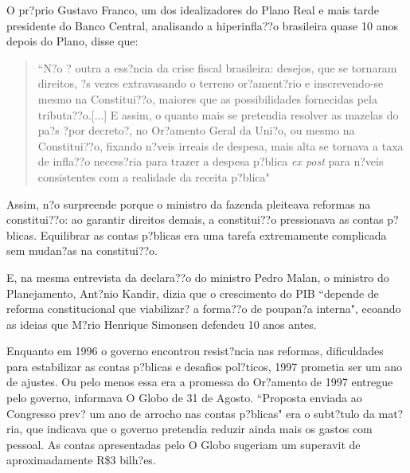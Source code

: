 \documentclass{article}
\begin{document}
O pr?prio Gustavo Franco, um dos idealizadores do Plano Real e mais tarde presidente do Banco Central, analisando a hiperinfla??o brasileira quase 10 anos depois do Plano, disse que:

\begin{quote}
``N?o ? outra a ess?ncia da crise fiscal brasileira: desejos, que se tornaram direitos, ?s vezes extravasando o terreno or?ament?rio e inscrevendo-se mesmo na Constitui??o, maiores que as possibilidades fornecidas pela tributa??o.[...] E assim, o quanto mais se pretendia resolver as mazelas do pa?s ?por decreto?, no Or?amento Geral da Uni?o, ou mesmo na Constitui??o, fixando n?veis irreais de despesa, mais alta se tornava a taxa de infla??o necess?ria para trazer a despesa p?blica \textit{ex post} para n?veis consistentes com a realidade da receita p?blica" \citep{Francoxxxx}
\end{quote}

Assim, n?o surpreende porque o ministro da fazenda pleiteava reformas na constitui??o: ao garantir direitos demais, a constitui??o pressionava as contas p?blicas. Equilibrar as contas p?blicas era uma tarefa extremamente complicada sem mudan?as na constitui??o. 

E, na mesma entrevista da declara??o do ministro Pedro Malan, o ministro do Planejamento, Ant?nio Kandir, dizia que o crescimento do PIB ``depende de reforma constitucional que viabilizar? a forma??o de poupan?a interna", ecoando as ideias que M?rio Henrique Simonsen defendeu 10 anos antes.  

Enquanto em 1996 o governo encontrou resist?ncia nas reformas, dificuldades para estabilizar as contas p?blicas e desafios pol?ticos, 1997 prometia ser um ano de ajustes. Ou pelo menos essa era a promessa do Or?amento de 1997 entregue pelo governo, informava O Globo de 31 de Agosto. ``Proposta enviada ao Congresso prev? um ano de arrocho nas contas p?blicas" era o subt?tulo da mat?ria, que indicava que o governo pretendia reduzir ainda mais os gastos com pessoal. As contas apresentadas pelo O Globo sugeriam um superavit de aproximadamente R\$3 bilh?es.
\end{document}
